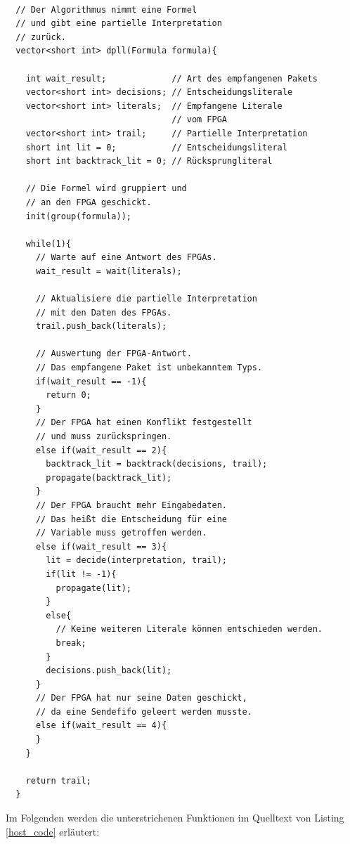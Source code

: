 \begin{lstlisting}[caption=Algorithmus Host-PC, label=host_code]
  
  // Der Algorithmus nimmt eine Formel
  // und gibt eine partielle Interpretation
  // zurück.
  vector<short int> dpll(Formula formula){

    int wait_result;             // Art des empfangenen Pakets
    vector<short int> decisions; // Entscheidungsliterale
    vector<short int> literals;  // Empfangene Literale 
                                 // vom FPGA
    vector<short int> trail;     // Partielle Interpretation
    short int lit = 0;           // Entscheidungsliteral
    short int backtrack_lit = 0; // Rücksprungliteral

    // Die Formel wird gruppiert und
    // an den FPGA geschickt.
    init(group(formula));

    while(1){
      // Warte auf eine Antwort des FPGAs.
      wait_result = wait(literals);

      // Aktualisiere die partielle Interpretation
      // mit den Daten des FPGAs.
      trail.push_back(literals);

      // Auswertung der FPGA-Antwort.
      // Das empfangene Paket ist unbekanntem Typs.
      if(wait_result == -1){
        return 0;
      }
      // Der FPGA hat einen Konflikt festgestellt
      // und muss zurückspringen.
      else if(wait_result == 2){
        backtrack_lit = backtrack(decisions, trail);
        propagate(backtrack_lit);
      }
      // Der FPGA braucht mehr Eingabedaten.
      // Das heißt die Entscheidung für eine
      // Variable muss getroffen werden.
      else if(wait_result == 3){
        lit = decide(interpretation, trail);
        if(lit != -1){
          propagate(lit);
        }
        else{
          // Keine weiteren Literale können entschieden werden.
          break;
        }
        decisions.push_back(lit);
      }
      // Der FPGA hat nur seine Daten geschickt,
      // da eine Sendefifo geleert werden musste.
      else if(wait_result == 4){
      }
    }

    return trail;
  }
\end{lstlisting}
Im Folgenden werden die unterstrichenen Funktionen im Quelltext von Listing \ref{host_code} erläutert:
